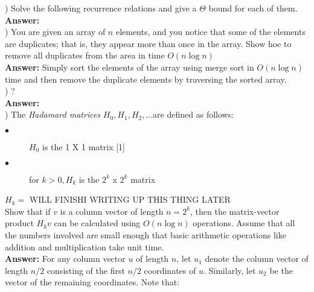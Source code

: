 \documentclass{article}
\begin{document}
\vspace{.3in}
) Solve the following recurrence relations and give a $\Theta$ bound for each of them.\\
\vspace{.1in}
{\bf Answer:} \\

\vspace{.3in}
) You are given an array of $n$ elements, and you notice that some of the elements are duplicates; that is, they appear more than once in the array. Show hoe to remove all duplicates from the area in time $O(n \log n)$\\
\vspace{.1in}
{\bf Answer:} Simply sort the elements of the array using merge sort in $O(n \log n)$ time and then remove the duplicate elements by traversing the sorted array.\\

\vspace{.3in}
) ?\\
\vspace{.1in}
{\bf Answer:} \\

\vspace{.3in}
) The \textit{Hadamard matrices} $H_{0}, H_{1}, H_{2}, $...are defined as follows: \\
\begin{description}
	\item[$\bullet$] $H_{0}$ is the 1 X 1 matrix [1]
	\item[$\bullet$] for $k > 0, H_{k}$ is the $2^k$ x $2^k$ matrix
\end{description}
\indent \indent $H_{k} = $ WILL FINISHI WRITING UP THIS THING LATER\\

\indent Show that if $v$ is a column vector of length $n = 2^k$, then the matrix-vector product $H_{k}v$ can be calculated using $O(n \log n)$ operations. Assume that all the numbers involved are small enough that basic arithmetic operations like addition and multiplication take unit time. \\
\vspace{.1in}
{\bf Answer:} For any column vector $u$ of length $n$, let $u_{1}$ denote the column vector of length $n/2$ consisting of the first $n/2$ coordinates of $u$. Similarly, let $u_{2}$ be the vector of the remaining coordinates. Note that: \\
\end{document}
